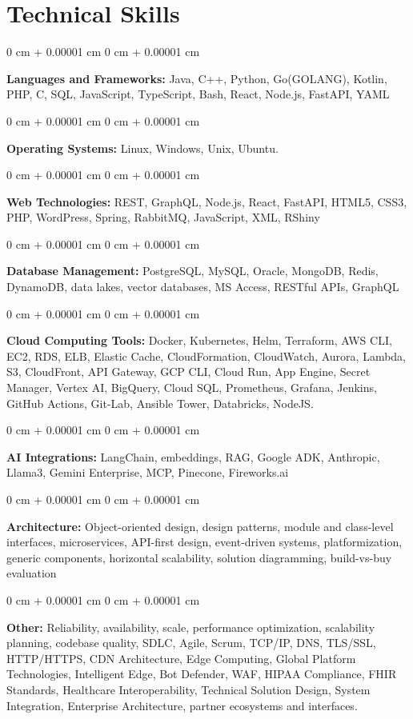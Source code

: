 \documentclass[10pt, letterpaper]{article}
\newenvironment{onecolentry}{
    \begin{adjustwidth}{
        0 cm + 0.00001 cm
    }{
        0 cm + 0.00001 cm
    }
}{
    \end{adjustwidth}
} %
\begin{document}
    \vspace{2 pt }

    \section{Technical Skills}
    \vspace{2 pt }
    \begin{onecolentry}
    \textbf{Languages and Frameworks:} Java, C++, Python, Go(GOLANG), Kotlin, PHP, C, SQL, JavaScript, TypeScript, Bash, React, Node.js, FastAPI, YAML
    \end{onecolentry}
    \begin{onecolentry}
        \textbf{Operating Systems:} Linux, Windows, Unix, Ubuntu.
    \end{onecolentry}
    \begin{onecolentry}
         \textbf{Web Technologies:} REST, GraphQL, Node.js, React, FastAPI, HTML5, CSS3, PHP, WordPress, Spring, RabbitMQ, JavaScript, XML, RShiny
    \end{onecolentry}
    \begin{onecolentry}
        \textbf{Database Management:} PostgreSQL, MySQL, Oracle, MongoDB, Redis, DynamoDB, data lakes, vector databases, MS Access, RESTful APIs, GraphQL
    \end{onecolentry}
    \begin{onecolentry}
        \textbf{Cloud Computing Tools:}
Docker, Kubernetes, Helm, Terraform, AWS CLI, EC2, RDS, ELB, Elastic Cache, CloudFormation, CloudWatch, Aurora, Lambda, S3, CloudFront, API Gateway, GCP CLI, Cloud Run, App Engine, Secret Manager, Vertex AI, BigQuery, Cloud SQL, Prometheus, Grafana, Jenkins, GitHub Actions, Git-Lab, Ansible Tower, Databricks, NodeJS.
    \end{onecolentry}
    \begin{onecolentry}
         \textbf{AI Integrations:} LangChain, embeddings, RAG, Google ADK, Anthropic, Llama3, Gemini Enterprise, MCP, Pinecone, Fireworks.ai
    \end{onecolentry}
    \begin{onecolentry}
        \textbf{Architecture:} Object-oriented design, design patterns, module and class-level interfaces, microservices, API-first design, event-driven systems, platformization, generic components, horizontal scalability, solution diagramming, build-vs-buy evaluation
    \end{onecolentry}
        \begin{onecolentry}
     \textbf{Other:} Reliability, availability, scale, performance optimization, scalability planning, codebase quality, SDLC, Agile, Scrum, TCP/IP, DNS, TLS/SSL, HTTP/HTTPS, CDN Architecture, Edge Computing, Global Platform Technologies, Intelligent Edge, Bot Defender, WAF, HIPAA Compliance, FHIR Standards, Healthcare Interoperability, Technical Solution Design, System Integration, Enterprise Architecture, partner ecosystems and interfaces.
    \end{onecolentry}
\end{document}
